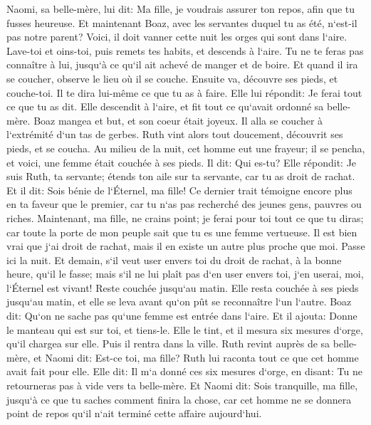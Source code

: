 \verse Naomi, sa belle-mère, lui dit: Ma fille, je voudrais assurer ton repos, afin que tu fusses heureuse. 
\verse Et maintenant Boaz, avec les servantes duquel tu as été, n`est-il pas notre parent? Voici, il doit vanner cette nuit les orges qui sont dans l`aire. 
\verse Lave-toi et oins-toi, puis remets tes habits, et descends à l`aire. Tu ne te feras pas connaître à lui, jusqu`à ce qu`il ait achevé de manger et de boire. 
\verse Et quand il ira se coucher, observe le lieu où il se couche. Ensuite va, découvre ses pieds, et couche-toi. Il te dira lui-même ce que tu as à faire. 
\verse Elle lui répondit: Je ferai tout ce que tu as dit. 
\verse Elle descendit à l`aire, et fit tout ce qu`avait ordonné sa belle-mère. 
\verse Boaz mangea et but, et son coeur était joyeux. Il alla se coucher à l`extrémité d`un tas de gerbes. Ruth vint alors tout doucement, découvrit ses pieds, et se coucha. 
\verse Au milieu de la nuit, cet homme eut une frayeur; il se pencha, et voici, une femme était couchée à ses pieds. 
\verse Il dit: Qui es-tu? Elle répondit: Je suis Ruth, ta servante; étends ton aile sur ta servante, car tu as droit de rachat. 
\verse Et il dit: Sois bénie de l`Éternel, ma fille! Ce dernier trait témoigne encore plus en ta faveur que le premier, car tu n`as pas recherché des jeunes gens, pauvres ou riches. 
\verse Maintenant, ma fille, ne crains point; je ferai pour toi tout ce que tu diras; car toute la porte de mon peuple sait que tu es une femme vertueuse. 
\verse Il est bien vrai que j`ai droit de rachat, mais il en existe un autre plus proche que moi. 
\verse Passe ici la nuit. Et demain, s`il veut user envers toi du droit de rachat, à la bonne heure, qu`il le fasse; mais s`il ne lui plaît pas d`en user envers toi, j`en userai, moi, l`Éternel est vivant! Reste couchée jusqu`au matin. 
\verse Elle resta couchée à ses pieds jusqu`au matin, et elle se leva avant qu`on pût se reconnaître l`un l`autre. Boaz dit: Qu`on ne sache pas qu`une femme est entrée dans l`aire. 
\verse Et il ajouta: Donne le manteau qui est sur toi, et tiens-le. Elle le tint, et il mesura six mesures d`orge, qu`il chargea sur elle. Puis il rentra dans la ville. 
\verse Ruth revint auprès de sa belle-mère, et Naomi dit: Est-ce toi, ma fille? Ruth lui raconta tout ce que cet homme avait fait pour elle. 
\verse Elle dit: Il m`a donné ces six mesures d`orge, en disant: Tu ne retourneras pas à vide vers ta belle-mère. 
\verse Et Naomi dit: Sois tranquille, ma fille, jusqu`à ce que tu saches comment finira la chose, car cet homme ne se donnera point de repos qu`il n`ait terminé cette affaire aujourd`hui. 

